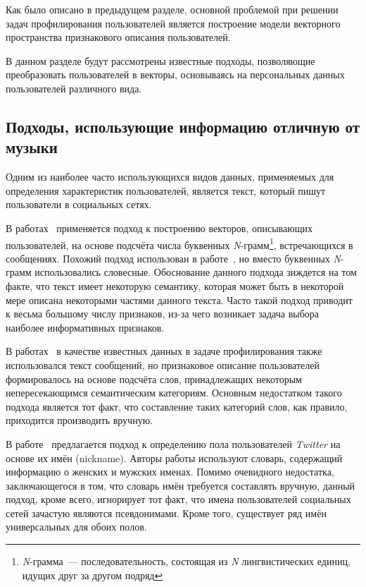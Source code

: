 Как было описано в предыдущем разделе, основной проблемой при решении
задач профилирования пользователей является построение модели
векторного пространства признакового описания пользователей.

В данном разделе будут рассмотрены известные подходы,
позволяющие преобразовать пользователей в векторы, основываясь
на персональных данных пользователей различного вида.

\subsection{Подходы, использующие информацию отличную от музыки}
\label{ssec:without_music}

Одним из наиболее часто использующихся видов данных, применяемых
для определения характеристик пользователей, является текст, который
пишут пользователи в социальных сетях. 

В работах~\cite{miller2012gender,deitrick2012gender} применяется
подход к построению векторов, описывающих пользователей, на основе подсчёта
числа буквенных \textit{N}-грамм\footnote{\textit{N}-грамма~--- 
последовательность, состоящая из \textit{N} лингвистических единиц,
идущих друг за другом подряд}, встречающихся в сообщениях. Похожий
подход использован в работе~\cite{turdakov2013opredelenie}, но
вместо буквенных \textit{N}-грамм использовались словесные. Обоснование
данного подхода зиждется на том факте, что текст имеет некоторую
семантику, которая может быть в некоторой мере описана некоторыми
частями данного текста. Часто такой подход приводит к весьма большому
числу признаков, из-за чего возникает задача выбора наиболее
информативных признаков.

В работах~\cite{rosenthal2011age,schwartz2013personality} в качестве
известных данных в задаче профилирования также
использовался текст сообщений, но признаковое описание пользователей
формировалось на основе подсчёта слов, принадлежащих некоторым
непересекающимся семантическим категориям. Основным недостатком такого подхода
является тот факт, что составление таких категорий слов, как правило,
приходится производить вручную.

В работе~\cite{sloan2013knowing} предлагается подход к определению
пола пользователей \textit{Twitter} на основе их имён (nickname).
Авторы работы используют словарь, содержащий информацию о женских и мужских
именах. Помимо очевидного недостатка, заключающегося в том, что
словарь имён требуется составлять вручную, данный подход, кроме всего,
игнорирует тот факт, что имена пользователей социальных сетей зачастую
являются псевдонимами. Кроме того, существует ряд имён универсальных
для обоих полов.

